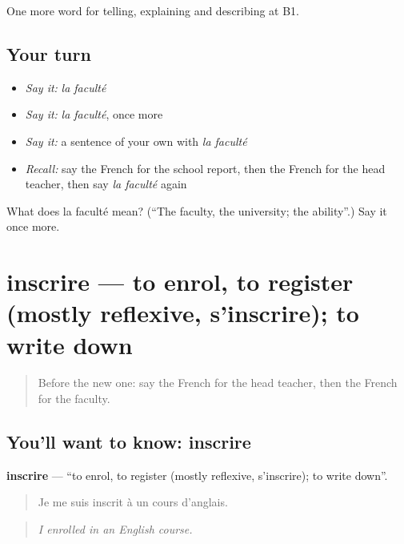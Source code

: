 \begin{grammarlens}[title={What you've built}]
One more word for telling, explaining and describing at B1.
\end{grammarlens}

\subsection*{Your turn}
\begin{itemize}
\raggedright
  \item \emph{Say it:} \emph{la faculté}
  \item \emph{Say it:} \emph{la faculté}, once more
  \item \emph{Say it:} a sentence of your own with \emph{la faculté}
  \item \emph{Recall:} say the French for the school report, then the French for the head teacher, then say \emph{la faculté} again
\end{itemize}

\begin{tcolorbox}[breakable,colback=teal!4,colframe=teal!35!black,title={Before you move on}]
What does la faculté mean? (\textquotedblleft{}The faculty, the university; the ability\textquotedblright{}.) Say it once more.
\end{tcolorbox}
\section[inscrire]{inscrire — to enrol, to register (mostly reflexive, s'inscrire); to write down}

\label{lesson:FR-C376-inscrire}



\begin{quote}
Before the new one: say the French for the head teacher, then the French for the faculty.
\end{quote}

\subsection*{You'll want to know: inscrire}
\textbf{inscrire} — \textquotedblleft{}to enrol, to register (mostly reflexive, s'inscrire); to write down\textquotedblright{}.

\begin{quote}
Je me suis inscrit à un cours d'anglais.
\end{quote}

\begin{quote}
\emph{I enrolled in an English course.}
\end{quote}


